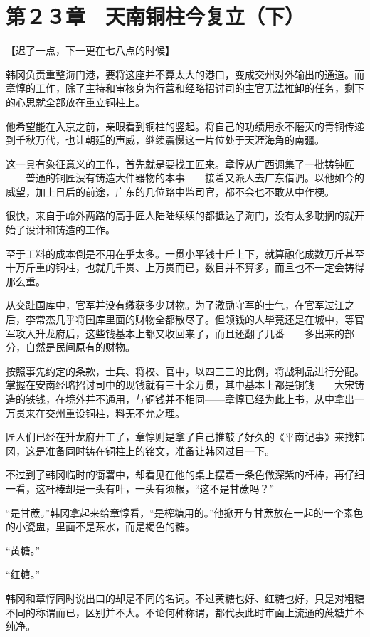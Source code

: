 \section{第２３章　天南铜柱今复立（下）}

【迟了一点，下一更在七八点的时候】

韩冈负责重整海门港，要将这座并不算太大的港口，变成交州对外输出的通道。而章惇的工作，除了主持和审核身为行营和经略招讨司的主官无法推卸的任务，剩下的心思就全部放在重立铜柱上。

他希望能在入京之前，亲眼看到铜柱的竖起。将自己的功绩用永不磨灭的青铜传递到千秋万代，也让朝廷的声威，继续震慑这一片位处于天涯海角的南疆。

这一具有象征意义的工作，首先就是要找工匠来。章惇从广西调集了一批铸钟匠——普通的铜匠没有铸造大件器物的本事——接着又派人去广东借调。以他如今的威望，加上日后的前途，广东的几位路中监司官，都不会也不敢从中作梗。

很快，来自于岭外两路的高手匠人陆陆续续的都抵达了海门，没有太多耽搁的就开始了设计和铸造的工作。

至于工料的成本倒是不用在乎太多。一贯小平钱十斤上下，就算融化成数万斤甚至十万斤重的铜柱，也就几千贯、上万贯而已，数目并不算多，而且也不一定会铸得那么重。

从交趾国库中，官军并没有缴获多少财物。为了激励守军的士气，在官军过江之后，李常杰几乎将国库里面的财物全都散尽了。但领钱的人毕竟还是在城中，等官军攻入升龙府后，这些钱基本上都又收回来了，而且还翻了几番——多出来的部分，自然是民间原有的财物。

按照事先约定的条款，士兵、将校、官中，以四三三的比例，将战利品进行分配。掌握在安南经略招讨司中的现钱就有三十余万贯，其中基本上都是铜钱——大宋铸造的铁钱，在境外并不通用，与铜钱并不相同——章惇已经为此上书，从中拿出一万贯来在交州重设铜柱，料无不允之理。

匠人们已经在升龙府开工了，章惇则是拿了自己推敲了好久的《平南记事》来找韩冈，这是准备同时铸在铜柱上的铭文，准备让韩冈过目一下。

不过到了韩冈临时的衙署中，却看见在他的桌上摆着一条色做深紫的杆棒，再仔细一看，这杆棒却是一头有叶，一头有须根，“这不是甘蔗吗？”

“是甘蔗。”韩冈拿起来给章惇看，“是榨糖用的。”他掀开与甘蔗放在一起的一个素色的小瓷盅，里面不是茶水，而是褐色的糖。

“黄糖。”

“红糖。”

韩冈和章惇同时说出口的却是不同的名词。不过黄糖也好、红糖也好，只是对粗糖不同的称谓而已，区别并不大。不论何种称谓，都代表此时市面上流通的蔗糖并不纯净。

